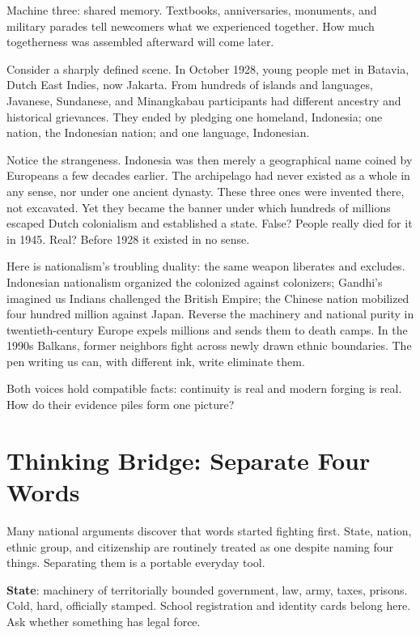 Machine three: shared memory. Textbooks, anniversaries, monuments, and military parades tell newcomers what we experienced together. How much togetherness was assembled afterward will come later.

Consider a sharply defined scene. In October 1928, young people met in Batavia, Dutch East Indies, now Jakarta. From hundreds of islands and languages, Javanese, Sundanese, and Minangkabau participants had different ancestry and historical grievances. They ended by pledging one homeland, Indonesia; one nation, the Indonesian nation; and one language, Indonesian.

Notice the strangeness. Indonesia was then merely a geographical name coined by Europeans a few decades earlier. The archipelago had never existed as a whole in any sense, nor under one ancient dynasty. These three ones were invented there, not excavated. Yet they became the banner under which hundreds of millions escaped Dutch colonialism and established a state. False? People really died for it in 1945. Real? Before 1928 it existed in no sense.

Here is nationalism's troubling duality: the same weapon liberates and excludes. Indonesian nationalism organized the colonized against colonizers; Gandhi's imagined us Indians challenged the British Empire; the Chinese nation mobilized four hundred million against Japan. Reverse the machinery and national purity in twentieth-century Europe expels millions and sends them to death camps. In the 1990s Balkans, former neighbors fight across newly drawn ethnic boundaries. The pen writing us can, with different ink, write eliminate them.

Both voices hold compatible facts: continuity is real and modern forging is real. How do their evidence piles form one picture?

\section{Thinking Bridge: Separate Four Words}
Many national arguments discover that words started fighting first. State, nation, ethnic group, and citizenship are routinely treated as one despite naming four things. Separating them is a portable everyday tool.

\textbf{State}: machinery of territorially bounded government, law, army, taxes, prisons. Cold, hard, officially stamped. School registration and identity cards belong here. Ask whether something has legal force.

